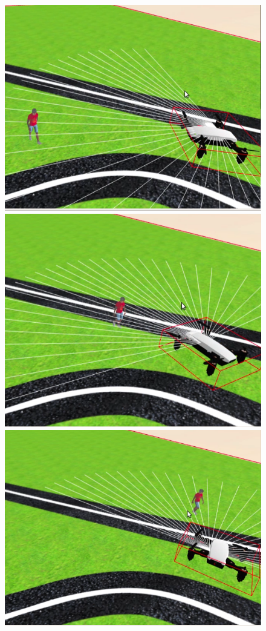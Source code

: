 \begin{figure}[!htb]
    \includegraphics[width=\linewidth]{figures/simulado/giro_1.png}
\endminipage\hfill
{}
    \includegraphics[width=\linewidth]{figures/simulado/giro_2.png}
\endminipage\hfill
{}
    \includegraphics[width=\linewidth]{figures/simulado/giro_3.png}

\end{figure}
